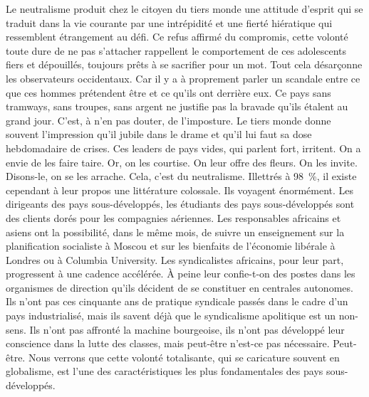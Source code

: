 \documentclass[french,twoside]{book} %
\begin{document}
\noindent Le neutralisme produit chez le citoyen du tiers monde une attitude d’esprit qui se traduit dans la vie courante par une intrépidité et une fierté hiératique qui ressemblent étrangement au défi. Ce refus affirmé du compromis, cette volonté toute dure de ne pas s’attacher rappellent le comportement de ces adolescents fiers et dépouillés, toujours prêts à se sacrifier pour un mot. Tout cela désarçonne les observateurs occidentaux. Car il y a à proprement parler un scandale entre ce que ces hommes prétendent être et ce qu’ils ont derrière eux. Ce pays sans tramways, sans troupes, sans argent ne justifie pas la bravade qu’ils étalent au grand jour. C’est, à n’en pas douter, de l’imposture. Le tiers monde donne souvent l’impression qu’il jubile dans le drame et qu’il lui faut sa dose hebdomadaire de crises. Ces leaders de pays vides, qui parlent fort, irritent. On a envie de les faire taire. Or, on les courtise. On leur offre des fleurs. On les invite. Disons-le, on se les arrache. Cela, c’est du neutralisme. Illettrés à 98 \%, il existe cependant à leur propos une littérature colossale. Ils voyagent énormément. Les dirigeants des pays sous-développés, les étudiants des pays sous-développés sont des clients dorés pour les compagnies aériennes. Les responsables africains et asiens ont la possibilité, dans le même mois, de suivre un enseignement sur la planification socialiste à Moscou et sur les bienfaits de l’économie libérale à Londres ou à Columbia University. Les syndicalistes africains, pour leur part, progressent à une cadence accélérée. À peine leur confie-t-on des postes dans les organismes de direction qu’ils décident de se constituer en centrales autonomes. Ils n’ont pas ces cinquante ans de pratique syndicale passés dans le cadre d’un pays industrialisé, mais ils savent déjà que le syndicalisme apolitique est un non-sens. Ils n’ont pas affronté la machine bourgeoise, ils n’ont pas   développé leur conscience dans la lutte des classes, mais peut-être n’est-ce pas nécessaire. Peut-être. Nous verrons que cette volonté totalisante, qui se caricature souvent en globalisme, est l’une des caractéristiques les plus fondamentales des pays sous-développés.\par
\end{document}
